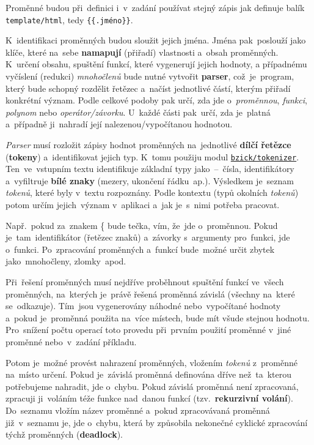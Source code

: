 \documentclass[11pt,a4paper]{report}
\begin{document}
            Proměnné budou při~definici i~v~zadání používat stejný zápis jak definuje balík \texttt{template/html}, tedy \texttt{\{\{.jméno\}\}}.

            K~identifikaci proměnných budou sloužit jejich jména. Jména pak~poslouží jako klíče, které na~sebe \textbf{namapují} (přiřadí) vlastnosti a~obsah proměnných. K~určení obsahu, spuštění funkcí, které vygenerují jejich hodnoty, a případnému vyčíslení (redukci) \emph{mnohočlenů} bude nutné vytvořit \textbf{parser}, což~je~program, který bude schopný rozdělit řetězec a~načíst jednotlivé částí, kterým přiřadí konkrétní význam. Podle celkové podoby pak určí, zda jde o~\emph{proměnnou}, \emph{funkci}, \emph{polynom} nebo \emph{operátor/závorku}. U~každé části pak~určí, zda je~platná a~případně ji~nahradí její nalezenou/vypočítanou hodnotou.
            
            \emph{Parser} musí rozložit zápisy hodnot proměnných na~jednotlivé \textbf{dílčí řetězce} (\textbf{tokeny}) a~identifikovat jejich typ. K~tomu použiju modul \href{github.com/bzick/tokenizer}{\texttt{bzick/tokenizer}}. Ten~ve~vstupním textu identifikuje základní typy jako~--~čísla, identifikátory a~vyfiltruje \textbf{bílé znaky} (mezery, ukončení řádku~ap.). Výsledkem je~seznam \emph{tokenů}, které byly v~textu rozpoznány. Podle kontextu (typů okolních \emph{tokenů}) potom určím jejich~význam v~aplikaci a~jak je~s~nimi potřeba pracovat.
            
            Např.~pokud za~znakem \{ bude tečka, vím, že~jde o~proměnnou. Pokud je~tam~identifikátor (řetězec znaků) a~závorky s~argumenty pro~funkci, jde o~funkci. Po~zpracování proměnných a~funkcí bude~možné určit zbytek jako~mnohočleny, zlomky~apod.
            
            Při~řešení proměnných musí nejdříve proběhnout spuštění funkcí ve~všech proměnných, na~kterých je~právě řešená proměnná závislá (všechny na~které se~odkazuje). Tím~jsou vygenerovány náhodné nebo~vypočítané hodnoty a~pokud je~proměnná použita na~více místech, bude mít všude stejnou hodnotu. Pro~snížení počtu operací toto provedu při~prvním použití proměnné v~jiné proměnné nebo~v~zadání příkladu.

            Potom je~možné provést nahrazení proměnných, vložením \emph{tokenů} z~proměnné na~místo určení. Pokud je~závislá proměnná definována dříve než~ta~kterou potřebujeme nahradit, jde o~chybu. Pokud závislá proměnná není zpracovaná, zpracuji ji~voláním téže funkce nad~danou funkcí (tzv.~\textbf{rekurzivní volání}). Do~seznamu vložím název proměnné a~pokud zpracovávaná proměnná již~v~seznamu je, jde o~chybu, která by způsobila nekonečné cyklické zpracování týchž proměnných (\textbf{deadlock}).
            
\end{document}
